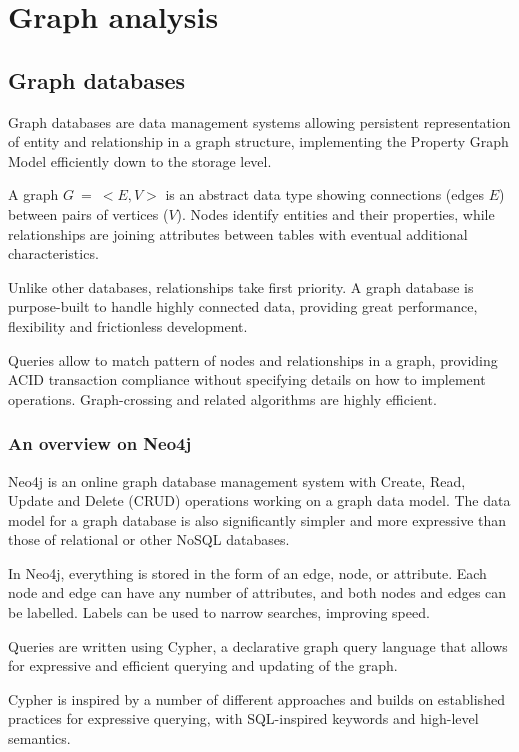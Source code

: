 \chapter{Graph analysis}

\section{Graph databases}
Graph databases are data management systems allowing persistent representation of entity and relationship in a graph structure, implementing the Property Graph Model efficiently down to the storage level.

A graph $G\: =\: <E, V>$ is an abstract data type showing connections (edges $E$) between pairs of vertices ($V$). Nodes identify entities and their properties, while relationships are joining attributes between tables with eventual additional characteristics. 

Unlike other databases, relationships take first priority. A graph database is purpose-built to handle highly connected data, providing great performance, flexibility and frictionless development.

Queries allow to match pattern of nodes and relationships in a graph, providing ACID transaction compliance without specifying details on how to implement operations. Graph-crossing and related algorithms are highly efficient.

\subsection{An overview on Neo4j}
Neo4j is an online graph database management system with Create, Read, Update and Delete (CRUD) operations working on a graph data model. The data model for a graph database is also significantly simpler and more expressive than those of relational or other NoSQL databases.

In Neo4j, everything is stored in the form of an edge, node, or attribute. Each node and edge can have any number of attributes, and both nodes and edges can be labelled. Labels can be used to narrow searches, improving speed.

Queries are written using Cypher, a declarative graph query language that allows for expressive and efficient querying and updating of the graph. 

Cypher is inspired by a number of different approaches and builds on established practices for expressive querying, with SQL-inspired keywords and high-level semantics\cite{neo4jdocumentation}.

